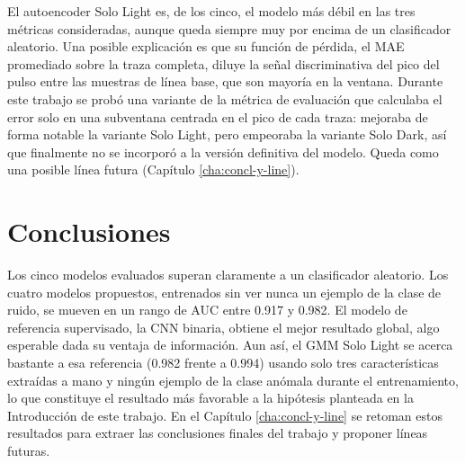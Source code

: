 El autoencoder Solo Light es, de los cinco, el modelo más débil en las tres métricas consideradas, aunque queda siempre muy por encima de un clasificador aleatorio. Una posible explicación es que su función de pérdida, el MAE promediado sobre la traza completa, diluye la señal discriminativa del pico del pulso entre las muestras de línea base, que son mayoría en la ventana. Durante este trabajo se probó una variante de la métrica de evaluación que calculaba el error solo en una subventana centrada en el pico de cada traza: mejoraba de forma notable la variante Solo Light, pero empeoraba la variante Solo Dark, así que finalmente no se incorporó a la versión definitiva del modelo. Queda como una posible línea futura (Capítulo \ref{cha:concl-y-line}).


\section{Conclusiones}
\label{sec:conclusiones-resultados}

Los cinco modelos evaluados superan claramente a un clasificador aleatorio. Los cuatro modelos propuestos, entrenados sin ver nunca un ejemplo de la clase de ruido, se mueven en un rango de AUC entre 0.917 y 0.982. El modelo de referencia supervisado, la CNN binaria, obtiene el mejor resultado global, algo esperable dada su ventaja de información. Aun así, el GMM Solo Light se acerca bastante a esa referencia (0.982 frente a 0.994) usando solo tres características extraídas a mano y ningún ejemplo de la clase anómala durante el entrenamiento, lo que constituye el resultado más favorable a la hipótesis planteada en la Introducción de este trabajo. En el Capítulo \ref{cha:concl-y-line} se retoman estos resultados para extraer las conclusiones finales del trabajo y proponer líneas futuras.


